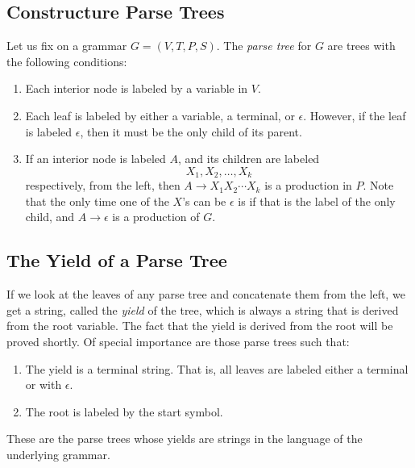 \documentclass[]{article}
\begin{document}
  \subsection*{Constructure Parse Trees}
    Let us fix on a grammar $G = (V,T,P,S)$. The \emph{parse tree} for $G$ are
    trees with the following conditions:
      \begin{enumerate}
        \item Each interior node is labeled by a variable in $V$.
        \item Each leaf is labeled by either a variable, a terminal, or
        $\epsilon$. However, if the leaf is labeled $\epsilon$, then it must be
        the only child of its parent.
        \item If an interior node is labeled $A$, and its children are labeled
          \[ X_1,X_2,\ldots{,}X_k \]
        respectively, from the left, then $A \rightarrow X_1X_2\cdots{}X_k$ is a
        production in $P$. Note that the only time one of the $X$'s can be
        $\epsilon$ is if that is the label of the only child, and $A \rightarrow
        \epsilon$ is a production of $G$.
      \end{enumerate}

  \subsection*{The Yield of a Parse Tree}
    If we look at the leaves of any parse tree and concatenate them from the
    left, we get a string, called the \emph{yield} of the tree, which is always
    a string that is derived from the root variable. The fact that the yield is
    derived from the root will be proved shortly. Of special importance are
    those parse trees such that:
      \begin{enumerate}
        \item The yield is a terminal string. That is, all leaves are labeled
        either a terminal or with $\epsilon$.
        \item The root is labeled by the start symbol.
      \end{enumerate}
    These are the parse trees whose yields are strings in the language of the
    underlying grammar.
\end{document}
